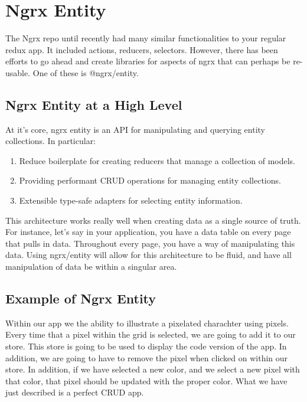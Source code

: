 \maketitle{}
\section{ Ngrx Entity }

The Ngrx repo until recently had many similar functionalities to your regular
redux app. It included actions, reducers, selectors. However, there has been
efforts to go ahead and create libraries for aspects of ngrx that can perhaps
be re-usable. One of these is @ngrx/entity.

\subsection{ Ngrx Entity at a High Level }
At it's core, ngrx entity is an API for manipulating and querying entity
collections. In particular:
\begin{enumerate}
  \item Reduce boilerplate for creating reducers that manage a collection of
  models.
  \item Providing performant CRUD operations for managing entity collections.
  \item Extensible type-safe adapters for selecting entity information.
\end{enumerate}

This architecture works really well when creating data as a single source of
truth. For instance, let's say in your application, you have a data table on
every page that pulls in data. Throughout every page, you have a way of
manipulating this data. Using ngrx/entity will allow for this architecture to
be fluid, and have all manipulation of data be within a singular area.

\subsection{ Example of Ngrx Entity }
Within our app we the ability to illustrate a pixelated charachter using pixels.
Every time that a pixel within the grid is selected, we are going to add it to
our store. This store is going to be used to display the code version of the
app. In addition, we are going to have to remove the pixel when clicked on
within our store. In addition, if we have selected a new color, and we select a
new pixel with that color, that pixel should be updated with the proper color.
What we have just described is a perfect CRUD app.

